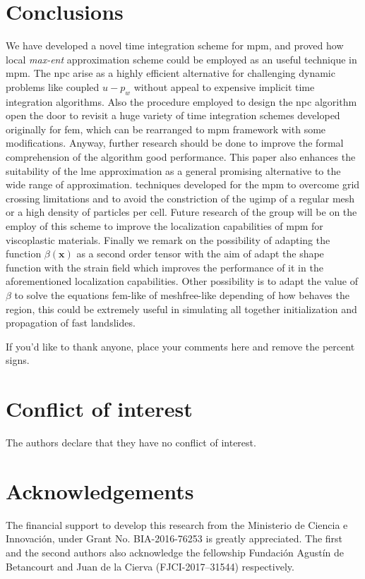 \documentclass[preprint,12pt,a4paper]{elsarticle}
\newcommand{\vect}[1]{
  \ensuremath{\mathbf{{#1}}}
}
\begin{document}
\section{Conclusions}
\label{sec:conclusions}
We have developed a novel time integration scheme for \acrshort{mpm}, and
proved how local \textit{max-ent} approximation scheme could be
employed as an useful technique in \acrshort{mpm}. The \acrshort{npc} arise as a highly
efficient alternative for challenging dynamic problems like coupled
$u-p_w$ without appeal to expensive implicit time integration
algorithms. Also the procedure employed to design the \acrshort{npc} algorithm open
the door to revisit a huge variety of time integration schemes
developed originally for \acrshort{fem}, which can be rearranged to \acrshort{mpm} framework
with some modifications. Anyway, further research should be done to improve the
formal comprehension of the algorithm good performance. This paper
also enhances the suitability of the \acrshort{lme} approximation as a
general promising alternative to the wide range of approximation.
techniques developed for the \acrshort{mpm} to overcome grid crossing
limitations and to avoid the constriction of the \acrshort{ugimp} of a regular mesh
or a high density of particles per cell. Future research of the
group will be on the employ of this scheme to improve the localization
capabilities of \acrshort{mpm} for viscoplastic materials. Finally we remark on
the possibility of adapting the function $\beta(\vect{x})$ as a second
order tensor with the aim of adapt the shape function with the strain field which improves the
performance of it in the aforementioned localization
capabilities. Other possibility is to adapt the value of $\beta$ to
solve the equations \acrshort{fem}-like of meshfree-like depending of how behaves
the region, this could be extremely useful in simulating all together
initialization and propagation of fast landslides.

\begin{acknowledgements}
If you'd like to thank anyone, place your comments here
and remove the percent signs.
\end{acknowledgements}

% 
\section*{Conflict of interest}
%
The authors declare that they have no conflict of interest.

% 
\section*{Acknowledgements}
%
The financial support to develop this research from the Ministerio de Ciencia e Innovación, under Grant No. BIA-2016-76253 is greatly appreciated. The first and the second authors also acknowledge the fellowship Fundaci\'on Agust\'in de Betancourt and Juan de la Cierva (FJCI-2017–31544) respectively.
\end{document}
